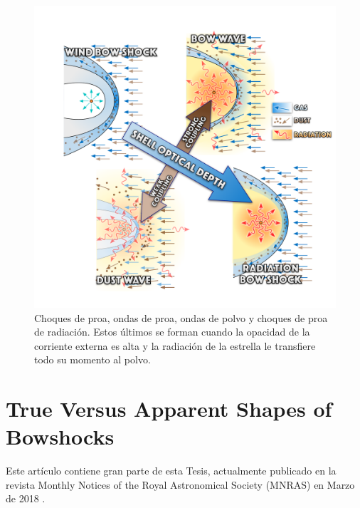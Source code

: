 \begin{figure}
  \includegraphics[width=\linewidth]{./Figures/bows-and-waves}
  \caption[Choques de proa, ondas de proa, ondas de polvo y choques de proa de radiación.]{Choques de proa, ondas de proa, ondas de polvo y choques de proa de radiación. Estos últimos se forman cuando la opacidad de la corriente externa es alta y la radiación de la estrella le transfiere todo su momento al polvo.}
  \label{fig:bow-wave}
\end{figure}



\chapter{True Versus Apparent Shapes of Bowshocks}
\label{app:article}
\thispagestyle{empty}

Este artículo contiene gran parte de esta Tesis, actualmente publicado en la revista Monthly Notices of the Royal Astronomical Society (MNRAS) en Marzo de 2018 \citep{Tarango-Yong:2018a}. 


\listoffigures
\listoftables
